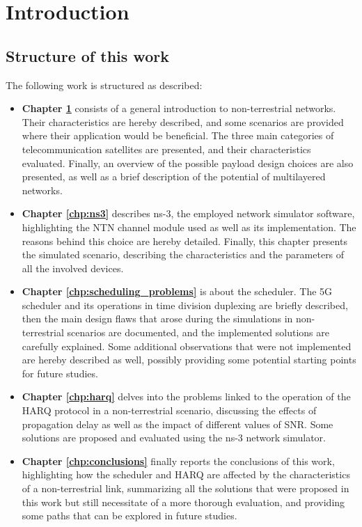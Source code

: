 
\chapter{Introduction}
\label{chp:intro}

\section{Structure of this work}
The following work is structured as described:

\begin{itemize}
    \item \textbf{Chapter \ref{chp:intro}} consists of a general introduction to non-terrestrial networks. Their characteristics are hereby described, and some scenarios are provided where their application would be beneficial. The three main categories of telecommunication satellites are presented, and their characteristics evaluated. Finally, an overview of the possible payload design choices are also presented, as well as a brief description of the potential of multilayered networks.
    \item \textbf{Chapter \ref{chp:ns3}} describes ns-3, the employed network simulator software, highlighting the NTN channel module used as well as its implementation. The reasons behind this choice are hereby detailed.
    Finally, this chapter presents the simulated scenario, describing the characteristics and the parameters of all the involved devices.
    \item \textbf{Chapter \ref{chp:scheduling_problems}} is about the scheduler. The 5G scheduler and its operations in time division duplexing are briefly described, then the main design flaws that arose during the simulations in non-terrestrial scenarios are documented, and the implemented solutions are carefully explained. Some additional observations that were not implemented are hereby described as well, possibly providing some potential starting points for future studies.
    \item \textbf{Chapter \ref{chp:harq}} delves into the problems linked to the operation of the HARQ protocol in a non-terrestrial scenario, discussing the effects of propagation delay as well as the impact of different values of SNR. Some solutions are proposed and evaluated using the ns-3 network simulator.
    \item \textbf{Chapter \ref{chp:conclusions}} finally reports the conclusions of this work, highlighting how the scheduler and HARQ are affected by the characteristics of a non-terrestrial link, summarizing all the solutions that were proposed in this work but still necessitate of a more thorough evaluation, and providing some paths that can be explored in future studies.
\end{itemize}


